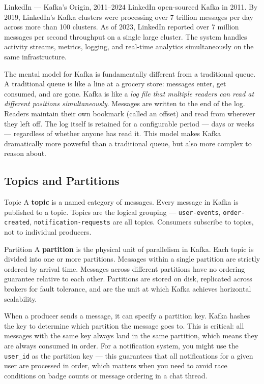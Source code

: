 \documentclass[11pt,a4paper]{article}
\begin{document}
\begin{industrybox}{LinkedIn --- Kafka's Origin, 2011--2024}
LinkedIn open-sourced Kafka in 2011. By 2019, LinkedIn's Kafka clusters were processing over 7 trillion messages per day across more than 100 clusters. As of 2023, LinkedIn reported over 7 million messages per second throughput on a single large cluster. The system handles activity streams, metrics, logging, and real-time analytics simultaneously on the same infrastructure.
\end{industrybox}

The mental model for Kafka is fundamentally different from a traditional queue. A traditional queue is like a line at a grocery store: messages enter, get consumed, and are gone. Kafka is like a \textit{log file that multiple readers can read at different positions simultaneously}. Messages are written to the end of the log. Readers maintain their own bookmark (called an offset) and read from wherever they left off. The log itself is retained for a configurable period --- days or weeks --- regardless of whether anyone has read it. This model makes Kafka dramatically more powerful than a traditional queue, but also more complex to reason about.

\subsection{Topics and Partitions}

\begin{termbox}{Topic}
A \textbf{topic} is a named category of messages. Every message in Kafka is published to a topic. Topics are the logical grouping --- \texttt{user-events}, \texttt{order-created}, \texttt{notification-requests} are all topics. Consumers subscribe to topics, not to individual producers.
\end{termbox}

\begin{termbox}{Partition}
A \textbf{partition} is the physical unit of parallelism in Kafka. Each topic is divided into one or more partitions. Messages within a single partition are strictly ordered by arrival time. Messages across different partitions have no ordering guarantee relative to each other. Partitions are stored on disk, replicated across brokers for fault tolerance, and are the unit at which Kafka achieves horizontal scalability.
\end{termbox}

When a producer sends a message, it can specify a partition key. Kafka hashes the key to determine which partition the message goes to. This is critical: all messages with the same key always land in the same partition, which means they are always consumed in order. For a notification system, you might use the \texttt{user\_id} as the partition key --- this guarantees that all notifications for a given user are processed in order, which matters when you need to avoid race conditions on badge counts or message ordering in a chat thread.
\end{document}
